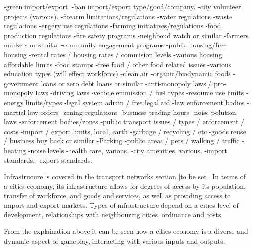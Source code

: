 
-green import/export.
-ban import/export type/good/company.
-city volunteer projects (various).
-firearm limitations/regulations
-water regulations
-waste regulations
-engery use regulations
-farming initiatives/regulations
-food production regulations
-fire safety programs
-neighboud watch or similar
-farmers markets or similar
-community engagement programs
-public housing/free housing
-rental rates / housing rates / commision levels
-various housing affordable limits
-food stamps
-free food / other food related issues
-various education types (will effect workforce)
-clean air
-organic/biodynamic foods
-government loans or zero debt loans or similar
-anti-monopoly laws / pro-monopoly laws
-driving laws
-vehicle emmission / fuel types 
-resource use limits
-energy limits/types
-legal system admin / free legal aid
-law enforcement bodies
-martial law orders
-zoning regulations
-business trading hours
-noise polution laws
-enforcement bodies/zones
-public transport issues / types / enforcement / costs
-import / export limits, local, earth
-garbage / recycling / etc
-goods reuse / business buy back or similar
-Parking
-public areas / pets / walking / traffic
-heating
-noise levels
-health care, various.
-city amenities, various.
-import standards.
-export standards.



Infrastrucure is covered in the transport networks section [to be set]. In terms of a cities economy, its infrastructure allows for degrees of access by its population, transfer of workforce, and goods and services, as well as providing access to import and export markets. Types of infrastructure depend on a cities level of development, relationships with neighbouring cities, ordinance and costs. 


From the explaination above it can be seen how a cities economy is a diverse and dynamic aspect of gameplay, interacting with various inputs and outputs. 





